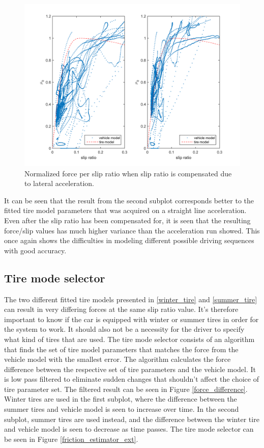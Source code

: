 \begin{figure}[h]
	\centering
	\includegraphics[width=1.0\textwidth]{Pictures/latacc_compensated}
	\caption {Normalized force per slip ratio when slip ratio is compensated due to lateral acceleration.}
	\label{latacc_compensated}
\end{figure}

It can be seen that the result from the second subplot corresponds better to the fitted tire model parameters that was acquired on a straight line acceleration. Even after the slip ratio has been compensated for, it is seen that the resulting force/slip values has much higher variance than the acceleration run showed. This once again shows the difficulties in modeling different possible driving sequences with good accuracy. 

\subsection{Tire mode selector}
The two different fitted tire models presented in \ref{winter_tire} and \ref{summer_tire} can result in very differing forces at the same slip ratio value. It's therefore important to know if the car is equipped with winter or summer tires in order for the system to work. It should also not be a necessity for the driver to specify what kind of tires that are used. The tire mode selector consists  of an algorithm that finds the set of tire model parameters that matches the force from the vehicle model with the smallest error. The algorithm calculates the force difference between the respective set of tire parameters and the vehicle model. It is low pass filtered to eliminate sudden changes that shouldn't affect the choice of tire parameter set. The filtered result can be seen in Figure \ref{force_difference}. Winter tires are used in the first subplot, where the difference between the summer tires and vehicle model is seen to increase over time. In the second subplot, summer tires are used instead, and the difference between the winter tire and vehicle model is seen to decrease as time passes. The tire mode selector can be seen in Figure \ref{friction_estimator_ext}.

